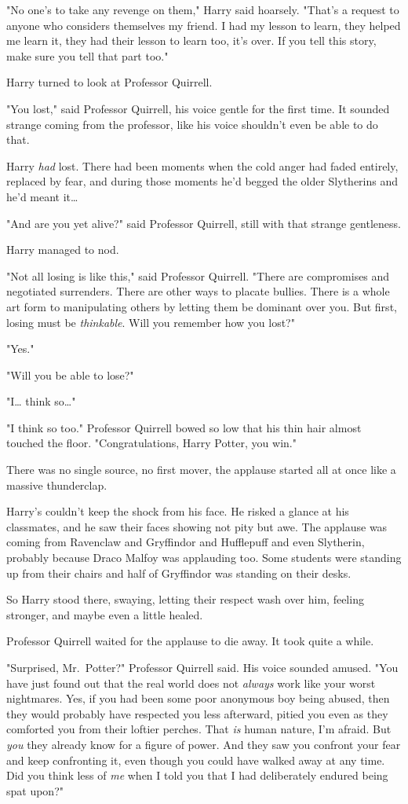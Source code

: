 "No one's to take any revenge on them," Harry said hoarsely. "That's a request
to anyone who considers themselves my friend. I had my lesson to learn, they
helped me learn it, they had their lesson to learn too, it's over. If you tell
this story, make sure you tell that part too."

Harry turned to look at Professor Quirrell.

"You lost," said Professor Quirrell, his voice gentle for the first time. It
sounded strange coming from the professor, like his voice shouldn't even be
able to do that.

Harry \emph{had} lost. There had been moments when the cold anger had faded
entirely, replaced by fear, and during those moments he'd begged the older
Slytherins and he'd meant it{\ldots}

"And are you yet alive?" said Professor Quirrell, still with that strange
gentleness.

Harry managed to nod.

"Not all losing is like this," said Professor Quirrell. "There are compromises
and negotiated surrenders. There are other ways to placate bullies. There is a
whole art form to manipulating others by letting them be dominant over you. But
first, losing must be \emph{thinkable}. Will you remember how you lost?"

"Yes."

"Will you be able to lose?"

"I{\ldots} think so{\ldots}"

"I think so too." Professor Quirrell bowed so low that his thin hair almost
touched the floor. "Congratulations, Harry Potter, you win."

There was no single source, no first mover, the applause started all at once
like a massive thunderclap.

Harry's couldn't keep the shock from his face. He risked a glance at his
classmates, and he saw their faces showing not pity but awe. The applause was
coming from Ravenclaw and Gryffindor and Hufflepuff and even Slytherin,
probably because Draco Malfoy was applauding too. Some students were standing
up from their chairs and half of Gryffindor was standing on their desks.

So Harry stood there, swaying, letting their respect wash over him, feeling
stronger, and maybe even a little healed.

Professor Quirrell waited for the applause to die away. It took quite a while.

"Surprised, Mr.~Potter?" Professor Quirrell said. His voice sounded amused.
"You have just found out that the real world does not \emph{always} work like
your worst nightmares. Yes, if you had been some poor anonymous boy being
abused, then they would probably have respected you less afterward, pitied you
even as they comforted you from their loftier perches. That \emph{is} human
nature, I'm afraid. But \emph{you} they already know for a figure of power. And
they saw you confront your fear and keep confronting it, even though you could
have walked away at any time. Did you think less of \emph{me} when I told you
that I had deliberately endured being spat upon?"

